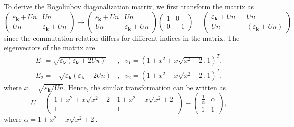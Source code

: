 \documentclass[aps,onecolumn,superscriptaddress,notitlepage,longbibliography]{revtex4-1}
\newcommand{\tmmathbf}[1]{\ensuremath{\boldsymbol{#1}}}
\begin{document}
To derive the Bogoliubov diagonalization matrix, we first transform the matrix
as
\begin{equation}
  \left(\begin{array}{cc}
    \varepsilon_{\tmmathbf{k}} + U n & U n\\
    U n & \varepsilon_{\tmmathbf{k}} + U n
  \end{array}\right) \rightarrow \left(\begin{array}{cc}
    \varepsilon_{\tmmathbf{k}} + U n & U n\\
    U n & \varepsilon_{\tmmathbf{k}} + U n
  \end{array}\right) \left(\begin{array}{cc}
    1 & 0\\
    0 & - 1
  \end{array}\right) = \left(\begin{array}{cc}
    \varepsilon_{\tmmathbf{k}} + U n & - U n\\
    U n & - (\varepsilon_{\tmmathbf{k}} + U n)
  \end{array}\right)
\end{equation}
since the commutation relation differs for different indices in the matrix.
The eigenvectors of the matrix are
\begin{eqnarray}
  E_1 = \sqrt{\varepsilon_{\tmmathbf{k}} (\varepsilon_{\tmmathbf{k}} + 2 U n)}
  & , & v_1 = \left( 1 + x^2 + x \sqrt{x^2 + 2}, 1 \right)^T, \\
  E_2 = - \sqrt{\varepsilon_{\tmmathbf{k}} (\varepsilon_{\tmmathbf{k}} + 2 U
  n)} & , & v_2 = \left( 1 + x^2 - x \sqrt{x^2 + 2}, 1 \right)^T, 
\end{eqnarray}
where $x = \sqrt{\varepsilon_{\tmmathbf{k}} / U n}$. Hence, the similar
transformation can be written as
\begin{equation}
  U = \left(\begin{array}{cc}
    1 + x^2 + x \sqrt{x^2 + 2} & 1 + x^2 - x \sqrt{x^2 + 2}\\
    1 & 1
  \end{array}\right) \equiv \left(\begin{array}{cc}
    \frac{1}{\alpha} & \alpha\\
    1 & 1
  \end{array}\right),
\end{equation}
where $\alpha = 1 + x^2 - x \sqrt{x^2 + 2}$.
\end{document}
